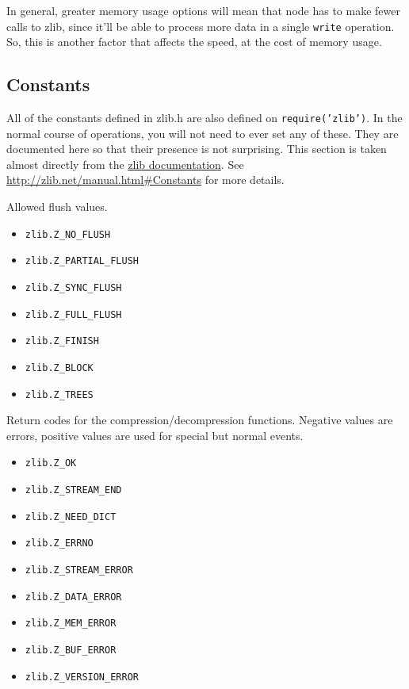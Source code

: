In general, greater memory usage options will mean that node has to make
fewer calls to zlib, since it'll be able to process more data in a
single \texttt{write} operation. So, this is another factor that affects
the speed, at the cost of memory usage.

\subsection{Constants}

All of the constants defined in zlib.h are also defined on
\texttt{require('zlib')}. In the normal course of operations, you will
not need to ever set any of these. They are documented here so that
their presence is not surprising. This section is taken almost directly
from the \href{http://zlib.net/manual.html\#Constants}{zlib
documentation}. See \url{http://zlib.net/manual.html#Constants} for more
details.

Allowed flush values.

\begin{itemize}
\item
  \texttt{zlib.Z\_NO\_FLUSH}
\item
  \texttt{zlib.Z\_PARTIAL\_FLUSH}
\item
  \texttt{zlib.Z\_SYNC\_FLUSH}
\item
  \texttt{zlib.Z\_FULL\_FLUSH}
\item
  \texttt{zlib.Z\_FINISH}
\item
  \texttt{zlib.Z\_BLOCK}
\item
  \texttt{zlib.Z\_TREES}
\end{itemize}

Return codes for the compression/decompression functions. Negative
values are errors, positive values are used for special but normal
events.

\begin{itemize}
\item
  \texttt{zlib.Z\_OK}
\item
  \texttt{zlib.Z\_STREAM\_END}
\item
  \texttt{zlib.Z\_NEED\_DICT}
\item
  \texttt{zlib.Z\_ERRNO}
\item
  \texttt{zlib.Z\_STREAM\_ERROR}
\item
  \texttt{zlib.Z\_DATA\_ERROR}
\item
  \texttt{zlib.Z\_MEM\_ERROR}
\item
  \texttt{zlib.Z\_BUF\_ERROR}
\item
  \texttt{zlib.Z\_VERSION\_ERROR}
\end{itemize}

